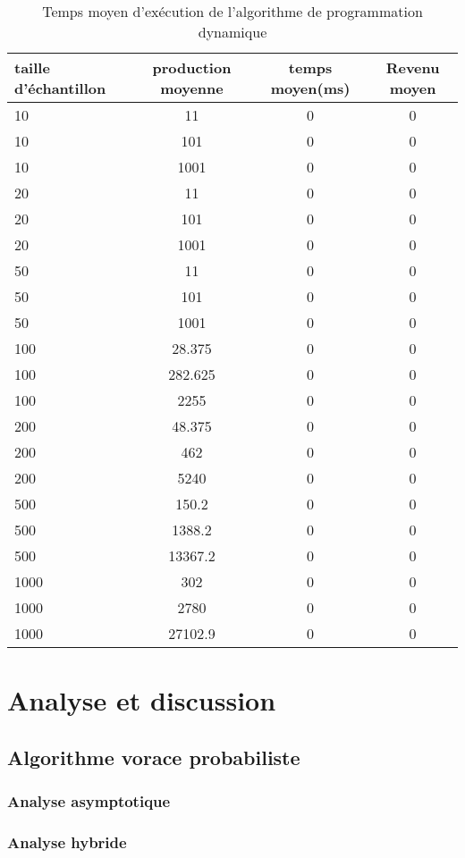 \documentclass[a4paper, 12pt]{article} %
\begin{document}
\begin{table}[H]
\caption{Temps moyen d'exécution de l'algorithme de programmation dynamique}
\centering
\begin{tabular}{| l | c | c | c |}
\hline
taille d'échantillon & production moyenne & temps moyen(ms)  & Revenu moyen\\
\hline
10 & 11 & 0 & 0\\
\hline
10 & 101 & 0 & 0\\
\hline
10 & 1001 & 0 & 0\\
\hline
20 & 11 & 0 & 0\\
\hline
20 & 101 & 0 & 0\\
\hline
20 & 1001 & 0 & 0\\
\hline
50 & 11 & 0 & 0\\
\hline
50 & 101 & 0 & 0\\
\hline
50 & 1001 & 0 & 0\\
\hline
100 & 28.375 & 0 & 0\\
\hline
100 & 282.625 & 0 & 0\\
\hline
100 & 2255 & 0 & 0\\
\hline
200 & 48.375 & 0 & 0\\
\hline
200 & 462 & 0 & 0\\
\hline
200 & 5240 & 0 & 0\\
\hline
500 & 150.2 & 0 & 0\\
\hline
500 & 1388.2 & 0 & 0\\
\hline
500 & 13367.2 & 0 & 0\\
\hline
1000 & 302 & 0 & 0\\
\hline
1000 & 2780 & 0 & 0\\
\hline
1000 & 27102.9 & 0 & 0\\
\hline
\end{tabular}
\end{table}
\section*{Analyse et discussion}
\subsection*{Algorithme vorace probabiliste}
\subsubsection*{Analyse asymptotique}
\subsubsection*{Analyse hybride}
\end{document}
